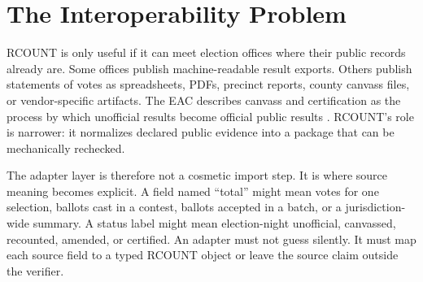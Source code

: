 \section{The Interoperability Problem}

RCOUNT is only useful if it can meet election offices where their public records
already are. Some offices publish machine-readable result exports. Others
publish statements of votes as spreadsheets, PDFs, precinct reports, county
canvass files, or vendor-specific artifacts. The EAC describes canvass and
certification as the process by which unofficial results become official public
results \citep{eac-canvass-certification}. RCOUNT's role is narrower: it
normalizes declared public evidence into a package that can be mechanically
rechecked.

The adapter layer is therefore not a cosmetic import step. It is where source
meaning becomes explicit. A field named ``total'' might mean votes for one
selection, ballots cast in a contest, ballots accepted in a batch, or a
jurisdiction-wide summary. A status label might mean election-night unofficial,
canvassed, recounted, amended, or certified. An adapter must not guess silently.
It must map each source field to a typed RCOUNT object or leave the source claim
outside the verifier.
